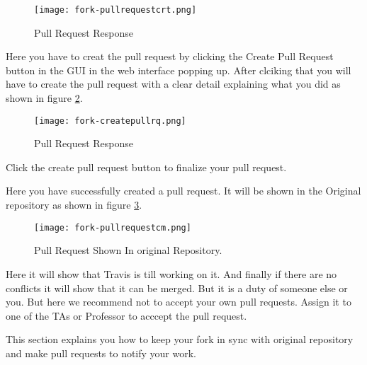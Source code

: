\begin{figure}[htb]\label{fig:forkpullrequestinfo}
\centering
\texttt{[image: fork-pullrequestcrt.png]}
\caption{Pull Request Response
}
\end{figure}

Here you have to creat the pull request by clicking the Create Pull
Request button in the GUI in the web interface popping up. After
clciking that you will have to create the pull request with a clear
detail explaining what you did as shown in figure
\ref{fig:forkpullrequestcr}.


\begin{figure}[htb]\label{fig:forkpullrequestcr}
\centering
\texttt{[image: fork-createpullrq.png]}
\caption{Pull Request Response
}
\end{figure}

Click the create pull request button to finalize your pull request. 

Here you have successfully created a pull request. It will be shown
in the Original repository as shown in figure \ref{fig:pullreqincm}.

\begin{figure}[htb]\label{fig:pullreqincm}
\centering
\texttt{[image: fork-pullrequestcm.png]}
\caption{Pull Request Shown In original Repository. 
}
\end{figure}

Here it will show that Travis is till working on it. And finally if
there are no conflicts it will show that it can be merged. But it is a
duty of someone else or you. But here we recommend not to accept your
own pull requests. Assign it to one of the TAs or Professor to acccept
the pull request.

This section explains you how to keep your fork in sync with original
repository and make pull requests to notify your work. 
